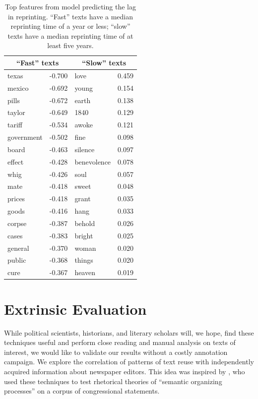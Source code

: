 \documentclass[pdftex,11pt]{article}
\begin{document}
\begin{table}
  \small
  \centering
  \caption{Top features from model predicting the lag in
    reprinting.  ``Fast'' texts have a median reprinting time of a
    year or less; ``slow'' texts have a median reprinting time of at
    least five years.}
  \label{tab:lag-features}
  \begin{tabular}{l r|l r}
\multicolumn{2}{c|}{``Fast'' texts} &
\multicolumn{2}{c}{``Slow'' texts} \\ \hline
texas & -0.700 & love & 0.459\\
mexico & -0.692 & young & 0.154\\
pills & -0.672 & earth & 0.138\\
taylor & -0.649 & 1840 & 0.129\\
tariff & -0.534 & awoke & 0.121\\
government & -0.502 & fine & 0.098\\
board & -0.463 & silence & 0.097\\
effect & -0.428 & benevolence & 0.078\\
whig & -0.426 & soul & 0.057\\
mate & -0.418 & sweet & 0.048\\
prices & -0.418 & grant & 0.035\\
goods & -0.416 & hang & 0.033\\
corpse & -0.387 & behold & 0.026\\
cases & -0.383 & bright & 0.025 \\
general & -0.370 & woman & 0.020\\
public & -0.368 & things & 0.020\\
cure & -0.367 & heaven & 0.019\\
  \end{tabular}
\end{table}

\section{Extrinsic Evaluation}
\label{sec:extrinsic}

While political scientists, historians, and literary scholars will, we
hope, find these techniques useful and perform close reading and
manual analysis on texts of interest, we would like to validate our
results without a costly annotation campaign.  We explore the
correlation of patterns of text reuse with independently acquired
information about newspaper editors.  This idea was inspired by
\citep{margolin13:_why_simil}, who used these techniques to test
rhetorical theories of ``semantic organizing processes'' on a corpus
of congressional statements.
\end{document}
